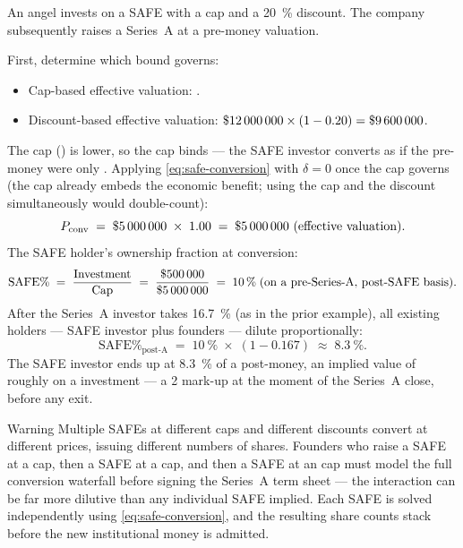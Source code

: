 \begin{example}
An angel invests  on a SAFE with a  cap and a \qty{20}{\percent}
discount. The company subsequently raises a Series~A at a  pre-money
valuation.

First, determine which bound governs:
\begin{itemize}
  \item Cap-based effective valuation: .
  \item Discount-based effective valuation: \(\$\num{12000000} \times (1 - 0.20) = \$\num{9600000}\).
\end{itemize}
The cap () is lower, so the cap binds --- the SAFE investor converts as if
the pre-money were only . Applying \cref{eq:safe-conversion} with
\(\delta = 0\) once the cap governs (the cap already embeds the economic benefit; using the
cap and the discount simultaneously would double-count):
\[
  P_{\mathrm{conv}} \;=\; \$\num{5000000} \;\times\; 1.00
                   \;=\; \$\num{5000000} \text{ (effective valuation).}
\]
The SAFE holder's ownership fraction at conversion:
\[
  \text{SAFE\%}
  \;=\; \frac{\mathrm{Investment}}{\mathrm{Cap}}
  \;=\; \frac{\$\num{500000}}{\$\num{5000000}}
  \;=\; \qty{10}{\percent} \;\text{(on a pre-Series-A, post-SAFE basis).}
\]
After the Series~A investor takes \qty{16.7}{\percent} (as in the prior example), all existing
holders --- SAFE investor plus founders --- dilute proportionally:
\[
  \text{SAFE\%}_{\text{post-A}}
  \;=\; \qty{10}{\percent} \;\times\; (1 - 0.167)
  \;\approx\; \qty{8.3}{\percent}.
\]
The SAFE investor ends up at \qty{8.3}{\percent} of a  post-money, an
implied value of roughly  on a  investment --- a \qty{2}{\times}
mark-up at the moment of the Series~A close, before any exit.
\end{example}

\begin{admonition}{Warning}
Multiple SAFEs at different caps and different discounts convert at different prices,
issuing different numbers of shares. Founders who raise a  SAFE at a
 cap, then a  SAFE at a  cap, and then a
 SAFE at an  cap must model the full conversion waterfall
before signing the Series~A term sheet --- the interaction can be far more dilutive than
any individual SAFE implied. Each SAFE is solved independently using \cref{eq:safe-conversion},
and the resulting share counts stack before the new institutional money is admitted.
\end{admonition}

